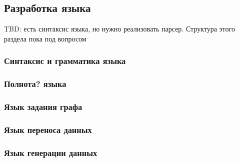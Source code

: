 \subsection{Разработка языка}
TBD: есть синтаксис языка, но нужно реализовать парсер. Структура этого раздела пока под вопросом

\subsubsection{Синтаксис и грамматика языка}

\subsubsection{Полнота? языка}

\subsubsection{Язык задания графа}

\subsubsection{Язык переноса данных}

\subsubsection{Язык генерации данных}
